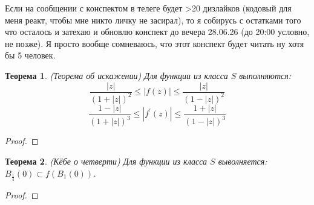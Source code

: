 \documentclass[12pt,a4paper]{article} %
\newtheorem{theorem}{Теорема}
\begin{document}
	Если на сообщении с конспектом в телеге будет >20 дизлайков (кодовый для меня реакт, чтобы мне никто личку не засирал), то я собирусь с остатками того что осталось и затехаю и обновлю конспект до вечера 28.06.26 (до 20:00 условно, не позже). Я просто вообще сомневаюсь, что этот конспект будет читать ну хотя бы 5 человек.
	\begin{theorem}
		(Теорема об искажении) Для функции из класса $S$ выполняются:
		$$\frac{|z|}{(1+|z|)^2}\leq|f(z)|\leq\frac{|z|}{(1-|z|)^2}$$
		$$\frac{1-|z|}{(1+|z|)^3}\leq|f^{'}(z)|\leq\frac{1+|z|}{(1-|z|)^3}$$
	\end{theorem}
	\begin{proof}
		
	\end{proof}
	\begin{theorem}
		(Кёбе о четверти) Для функции из класса $S$ выволняется: $B_{\frac{1}{4}}(0)\subset f(B_1(0))$.
	\end{theorem}
	\begin{proof}
		
	\end{proof}
\end{document}
